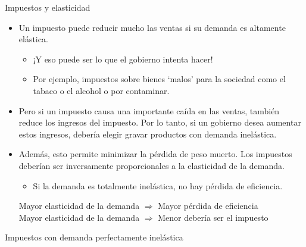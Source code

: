 \documentclass{beamer}
\begin{document}
\begin{frame}{Impuestos y elasticidad}
    \begin{itemize}
        \item Un impuesto puede reducir mucho las ventas si su demanda es altamente elástica.
        \begin{itemize}
            \item ¡Y eso puede ser lo que el gobierno intenta hacer!
            \item Por ejemplo, impuestos sobre bienes ‘malos’ para la sociedad como el tabaco o el alcohol o por contaminar.
        \end{itemize}
        \vspace{1mm}
        \item Pero si un impuesto causa una importante caída en las ventas, también reduce los ingresos del impuesto. Por lo tanto, si un gobierno desea aumentar estos ingresos, debería elegir gravar productos con demanda inelástica. 
        \vspace{1mm}
        \item Además, esto permite minimizar la pérdida de peso muerto. Los impuestos deberían ser inversamente proporcionales a la elasticidad de la demanda.
            \begin{itemize}
            \item Si la demanda es totalmente inelástica, no hay pérdida de eficiencia. 
            \end{itemize}
        \begin{boxB}
        \centering
        \small
        Mayor elasticidad de la demanda $\Longrightarrow$ Mayor pérdida de eficiencia \\
        Mayor elasticidad de la demanda $\Longrightarrow$ Menor debería ser el impuesto
        \end{boxB}
    \end{itemize}
\end{frame}

\begin{frame}{Impuestos con demanda perfectamente inelástica}

    \begin{figure} [H]
        \centering
    \end{figure} 
\end{frame}
\end{document}
